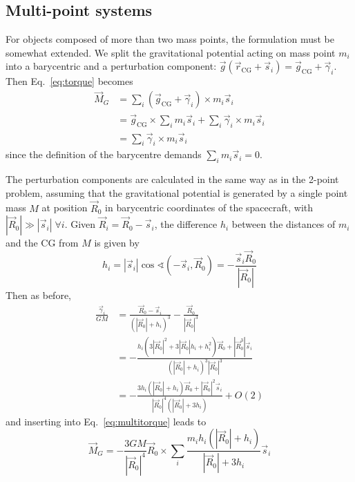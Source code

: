 \documentclass[a4paper]{article}
\begin{document}
\subsection{Multi-point systems}
For objects composed of more than two mass points, the formulation must be somewhat extended. We split the gravitational potential acting on mass point $m_i$ into a barycentric and a perturbation component: $\vec{g}(\vec{r}_\text{CG} + \vec{s}_i) = \vec{g}_\text{CG} + \vec{\gamma}_i$.
Then Eq.~\ref{eq:torque} becomes
\begin{equation}\label{eq:multitorque}
\begin{split}
\vec{M}_G &= \sum_i (\vec{g}_\text{CG} + \vec{\gamma}_i) \times m_i \vec{s}_i\\
&= \vec{g}_\text{CG} \times \sum_i m_i \vec{s}_i + \sum_i \vec{\gamma}_i \times m_i \vec{s}_i\\
&= \sum_i \vec{\gamma}_i \times m_i \vec{s}_i
\end{split}
\end{equation}
since the definition of the barycentre demands $\sum_i m_i \vec{s}_i = 0$.

The perturbation components are calculated in the same way as in the 2-point problem, assuming that the gravitational potential is generated by a single point mass $M$ at position $\vec{R}_0$ in barycentric coordinates of the spacecraft, with $|\vec{R}_0| \gg |\vec{s}_i|\;\forall i$.
Given $\vec{R}_i = \vec{R}_0 - \vec{s}_i$, the difference $h_i$ between the distances of $m_i$ and the CG from $M$ is given by
\begin{equation*}
h_i = |\vec{s}_i| \cos\sphericalangle (-\vec{s}_i, \vec{R}_0)
= -\frac{\vec{s}_i \vec{R}_0}{|\vec{R}_0|}
\end{equation*}
Then as before,
\begin{equation*}
\begin{split}
\frac{\vec{\gamma}_i}{GM} &= \frac{\vec{R}_0 - \vec{s}_i}{(|\vec{R}_0|+h_i)^3} - \frac{\vec{R}_0}{|\vec{R}_0|^3} \\
&= -\frac{h_i(3|\vec{R}_0|^2 + 3|\vec{R}_0| h_i + h_i^2) \vec{R}_0 + |\vec{R}_0^3| \vec{s}_i}{(|\vec{R}_0|+h_i)^3 |\vec{R}_0|^3} \\
&= -\frac{3h_i(|\vec{R}_0|+h_i) \vec{R}_0 + |\vec{R}_0|^2 \vec{s}_i}{|\vec{R}_0|^4 (|\vec{R}_0| + 3h_i)} + O(2)
\end{split}
\end{equation*}
and inserting into Eq.~\ref{eq:multitorque} leads to
\begin{equation*}
\vec{M}_G = -\frac{3GM}{|\vec{R}_0|^4} \vec{R}_0 \times \sum_i
\frac{m_i h_i(|\vec{R}_0|+h_i)}{|\vec{R}_0| + 3h_i} \vec{s}_i
\end{equation*}
\end{document}
